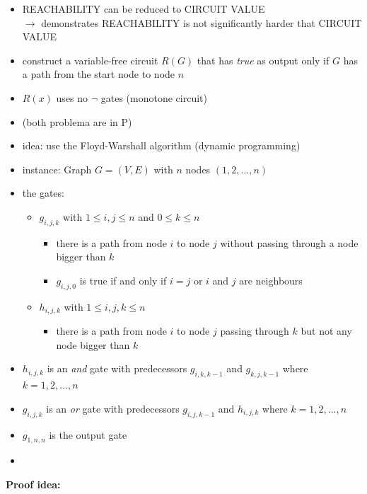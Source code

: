 \documentclass[a4]{scrartcl}
\begin{document}
\begin{itemize}
\item REACHABILITY can be reduced to CIRCUIT VALUE \\
$\rightarrow$ demonstrates REACHABILITY is not significantly harder that CIRCUIT VALUE
\item construct a variable-free circuit $R(G)$ that has \textit{true} as output only if $G$ has a path from the start node to node $n$ 
\item $R(x)$ uses no $\lnot$ gates (monotone circuit) 
\item (both problema are in P)
\item idea: use the Floyd-Warshall algorithm (dynamic programming)
\item instance: Graph $G = (V, E)$ with $n$ nodes $(1,2,...,n)$

\item the gates:
\begin{itemize}
\item $g_{i,j,k}$ with $1 \leq i, j \leq n$ and $0 \leq k \leq n$
\begin{itemize}
\item there is a path from node $i$ to node $j$ without passing through a node bigger than $k$
\item $g_{i,j,0}$ is true if and only if $i=j$ or $i$ and $j$ are neighbours
\end{itemize}
\item $h_{i,j,k}$ with $1 \leq i, j, k \leq n$
\begin{itemize}
\item there is a path from node $i$ to node $j$ passing through $k$ but not any node bigger than $k$
\end{itemize}

\end{itemize}

\item $h_{i,j,k}$ is an \textit{and} gate with predecessors $g_{i, k, k-1}$ and $g_{k, j, k-1}$ where $k= 1, 2, ..., n$
\item $g_{i, j, k}$ is an \textit{or} gate with predecessors $g_{i, j, k-1}$ and $h_{i, j, k}$ where $k = 1, 2, ... , n$
\item $g_{1,n,n}$ is the output gate

\item [] \cite{RCV}

\end{itemize}

\textbf{Proof idea:}
\end{document}
